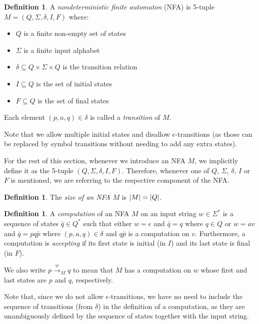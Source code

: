 \documentclass{report}
\DeclarePairedDelimiter{\abs}{\lvert}{\rvert}
\theoremstyle{definition}
\newtheorem{definition}[theorem]{Definition}
\begin{document}
\begin{definition} \label{def.NFA}
A \emph{nondeterministic finite automaton} (NFA) is 5-tuple
$M = (Q, \Sigma, \delta, I, F)$ where:

\begin{itemize}
\item $Q$ is a finite non-empty set of states
\item $\Sigma$ is a finite input alphabet
\item $\delta \subseteq Q \times \Sigma \times Q$ is the transition relation
\item $I \subseteq Q$ is the set of initial states
\item $F \subseteq Q$ is the set of final states
\end{itemize}

Each element $(p, a, q) \in \delta$ is called a \emph{transition} of $M$.

Note that we allow multiple initial states and disallow
$\epsilon$-transitions (as those can be replaced by symbol transitions
without needing to add any extra states).
\end{definition}

For the rest of this section, whenever we introduce an NFA $M$, we implicitly
define it as the 5-tuple $(Q, \Sigma, \delta, I, F)$. Therefore, whenever
one of $Q$, $\Sigma$, $\delta$, $I$ or $F$ is mentioned, we are referring to
the respective component of the NFA.

\begin{definition} \label{def.NFA_size}
The \emph{size of an NFA} $M$ is $\abs{M} = \abs{Q}$.
\end{definition}

\begin{definition} \label{def.computation}
A \emph{computation} of an NFA $M$ on an input string $w \in \Sigma^{\ast}$
is a sequence of states $\bar{q} \in Q^{\ast}$ such that either $w = \epsilon$
and $\bar{q} = q$ where $q \in Q$ or $w = av$ and $\bar{q} = pq \bar{p}$ where
$(p, a, q) \in \delta$ and $q \bar{p}$ is a computation on $v$. Furthermore,
a computation is \emph{accepting} if its first state is initial (in $I$) and
its last state is final (in $F$).

We also write $p \xrightarrow{w}_M q$ to mean that $M$ has a computation on $w$
whose first and last states are $p$ and $q$, respectively.

Note that, since we do not allow $\epsilon$-transitions, we have no need to include
the sequence of transitions (from $\delta$) in the definition of a computation, as
they are unambiguously defined by the sequence of states together with the input
string.
\end{definition}
\end{document}
